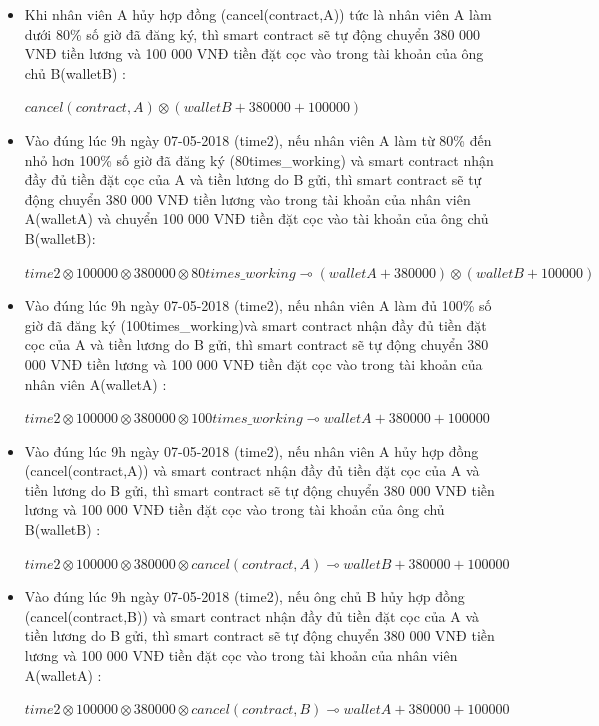 \documentclass[12pt,a4paper,oneside]{article}
\begin{document}
\begin{itemize}
	\item Khi nhân viên A hủy hợp đồng (cancel(contract,A)) tức là nhân viên A làm dưới 80\% số giờ đã đăng ký, thì smart contract sẽ tự động chuyển 380 000 VNĐ tiền lương và 100 000 VNĐ tiền đặt cọc vào trong tài khoản của ông chủ B(walletB) : 
	\begin{center}
		$cancel(contract,A)  \otimes (walletB + 380 000 + 100 000) $
	\end{center}
	
	\item Vào đúng lúc 9h ngày 07-05-2018 (time2), nếu nhân viên A làm từ 80\% đến nhỏ hơn 100\% số giờ đã đăng ký  (80times\_working) và smart contract nhận đầy đủ tiền đặt cọc của A và tiền lương do B gửi, thì smart contract sẽ tự động chuyển 380 000 VNĐ tiền lương vào trong tài khoản của nhân viên A(walletA) và chuyển 100 000 VNĐ tiền đặt cọc  vào tài khoản của ông chủ B(walletB):
	\begin{center}
		$time2 \otimes 100 000 \otimes 380 000 \otimes  80times\_working \multimap  (walletA + 380 000) \otimes (walletB + 100000)$
	\end{center}
	
	\item Vào đúng lúc 9h ngày 07-05-2018 (time2), nếu nhân viên A làm đủ 100\% số giờ đã đăng ký (100times\_working)và smart contract nhận đầy đủ tiền đặt cọc của A và tiền lương do B gửi, thì smart contract sẽ tự động chuyển 380 000 VNĐ tiền lương và 100 000 VNĐ tiền đặt cọc vào trong tài khoản của nhân viên A(walletA) : 
	\begin{center}
		$time2 \otimes 100 000 \otimes 380 000 \otimes  100times\_working \multimap  walletA + 380 000 + 100 000$
	\end{center}
	
	\item Vào đúng lúc 9h ngày 07-05-2018 (time2), nếu nhân viên A hủy hợp đồng (cancel(contract,A)) và smart contract nhận đầy đủ tiền đặt cọc của A và tiền lương do B gửi, thì smart contract sẽ tự động chuyển 380 000 VNĐ tiền lương và 100 000 VNĐ tiền đặt cọc vào trong tài khoản của ông chủ B(walletB) : 
	\begin{center}
		$time2 \otimes 100 000 \otimes 380 000 \otimes cancel(contract,A) \multimap walletB + 380 000 + 100 000$
	\end{center}
	
	\item Vào đúng lúc 9h ngày 07-05-2018 (time2), nếu ông chủ B hủy hợp đồng (cancel(contract,B)) và smart contract nhận đầy đủ tiền đặt cọc của A và tiền lương do B gửi, thì smart contract sẽ tự động chuyển 380 000 VNĐ tiền lương và 100 000 VNĐ tiền đặt cọc vào trong tài khoản của nhân viên A(walletA) : 
	\begin{center}
		$time2 \otimes 100 000 \otimes 380 000 \otimes  cancel(contract,B) \multimap   walletA + 380 000 + 100 000$
	\end{center}
	

\end{itemize}
\end{document}
